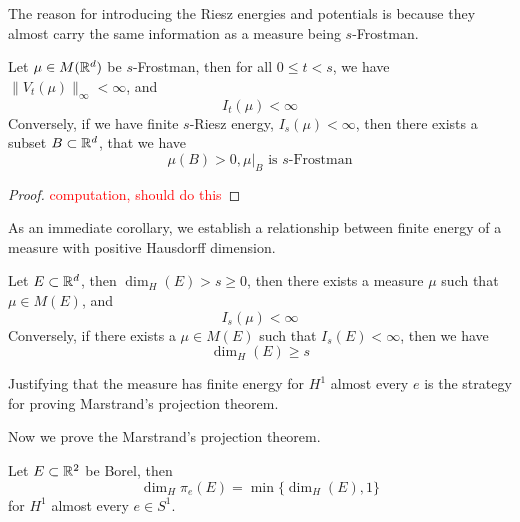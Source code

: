 The reason for introducing the Riesz energies and potentials is because they almost carry the same information as a measure being $s$-Frostman.
\begin{proposition}
    Let $\mu\in M(\mathbb{R}^d)$ be $s$-Frostman, then for all $0\leq t<s$, we have $\|V_t(\mu)\|_\infty<\infty$, and
    \begin{equation*}
        I_t(\mu)<\infty
    \end{equation*}
    Conversely, if we have finite $s$-Riesz energy, $I_s(\mu)<\infty$, then there exists a subset $B\subset\mathbb{R}^d$, that we have
    \begin{equation*}
        \mu(B)>0, \mu\vert_B \text{ is $s$-Frostman}
    \end{equation*}
\end{proposition}
\begin{proof}
    \textcolor{red}{computation, should do this}
\end{proof}

As an immediate corollary, we establish a relationship between finite energy of a measure with positive Hausdorff dimension.
\begin{corollary}
    Let $E\subset\mathbb{R}^d$, then $\dim_H(E)>s\geq0$, then there exists a measure $\mu$ such that $\mu\in M(E)$, and 
    \begin{equation*}
        I_s(\mu)<\infty
    \end{equation*}
    Conversely, if there exists a $\mu\in M(E)$ such that $I_s(E)<\infty$, then we have
    \begin{equation*}
        \dim_H(E)\geq s
    \end{equation*}
\end{corollary}

\begin{note}
    Justifying that the measure has finite energy for $H^1$ almost every $e$ is the strategy for proving Marstrand's projection theorem.
\end{note}
Now we prove the Marstrand's projection theorem.
\begin{theorem}
    Let $E\subset\mathbb{R}^2$ be Borel, then
    \begin{equation*}
        \dim_H\pi_e(E)=\min\{\dim_H(E), 1\}
    \end{equation*}
    for $H^1$ almost every $e\in S^1$.
\end{theorem}


